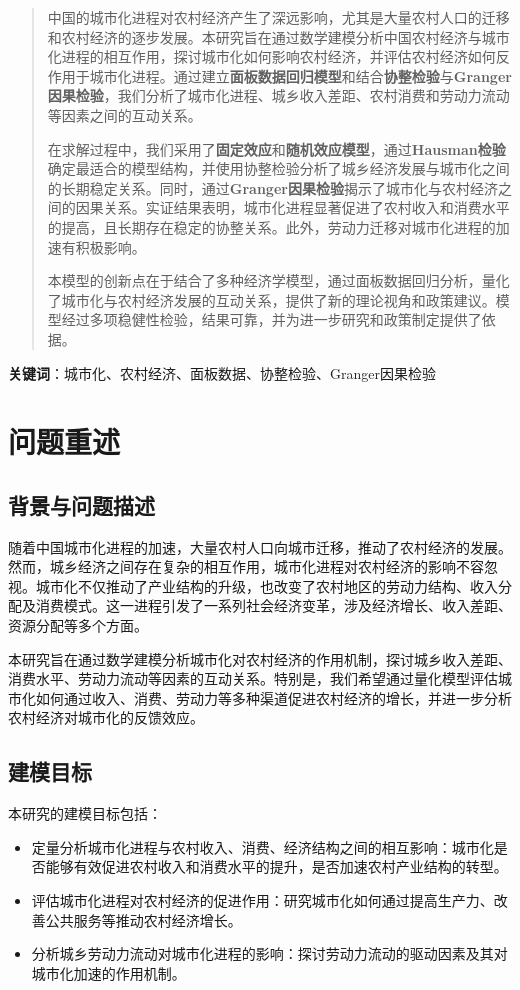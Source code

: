 \documentclass[12pt]{article}
\begin{document}
\begin{abstract}
中国的城市化进程对农村经济产生了深远影响，尤其是大量农村人口的迁移和农村经济的逐步发展。本研究旨在通过数学建模分析中国农村经济与城市化进程的相互作用，探讨城市化如何影响农村经济，并评估农村经济如何反作用于城市化进程。通过建立\textbf{面板数据回归模型}和结合\textbf{协整检验}与\textbf{Granger因果检验}，我们分析了城市化进程、城乡收入差距、农村消费和劳动力流动等因素之间的互动关系。

在求解过程中，我们采用了\textbf{固定效应}和\textbf{随机效应模型}，通过\textbf{Hausman检验}确定最适合的模型结构，并使用协整检验分析了城乡经济发展与城市化之间的长期稳定关系。同时，通过\textbf{Granger因果检验}揭示了城市化与农村经济之间的因果关系。实证结果表明，城市化进程显著促进了农村收入和消费水平的提高，且长期存在稳定的协整关系。此外，劳动力迁移对城市化进程的加速有积极影响。

本模型的创新点在于结合了多种经济学模型，通过面板数据回归分析，量化了城市化与农村经济发展的互动关系，提供了新的理论视角和政策建议。模型经过多项稳健性检验，结果可靠，并为进一步研究和政策制定提供了依据。
\end{abstract}

\textbf{关键词}：城市化、农村经济、面板数据、协整检验、Granger因果检验

\newpage

\section{问题重述}

\subsection{背景与问题描述}
随着中国城市化进程的加速，大量农村人口向城市迁移，推动了农村经济的发展。然而，城乡经济之间存在复杂的相互作用，城市化进程对农村经济的影响不容忽视。城市化不仅推动了产业结构的升级，也改变了农村地区的劳动力结构、收入分配及消费模式。这一进程引发了一系列社会经济变革，涉及经济增长、收入差距、资源分配等多个方面。

本研究旨在通过数学建模分析城市化对农村经济的作用机制，探讨城乡收入差距、消费水平、劳动力流动等因素的互动关系。特别是，我们希望通过量化模型评估城市化如何通过收入、消费、劳动力等多种渠道促进农村经济的增长，并进一步分析农村经济对城市化的反馈效应。

\subsection{建模目标}
本研究的建模目标包括：
\begin{itemize}
    \item 定量分析城市化进程与农村收入、消费、经济结构之间的相互影响：城市化是否能够有效促进农村收入和消费水平的提升，是否加速农村产业结构的转型。
    \item 评估城市化进程对农村经济的促进作用：研究城市化如何通过提高生产力、改善公共服务等推动农村经济增长。
    \item 分析城乡劳动力流动对城市化进程的影响：探讨劳动力流动的驱动因素及其对城市化加速的作用机制。
\end{itemize}
\end{document}
